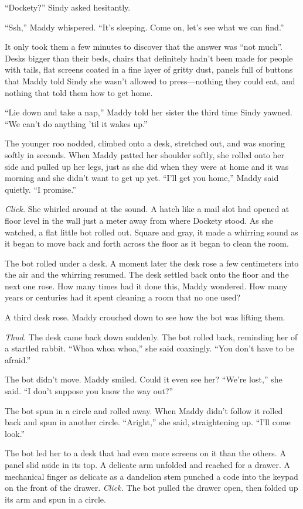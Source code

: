 \documentclass[10pt]{article}
\begin{document}
``Dockety?'' Sindy asked hesitantly.

``Ssh,'' Maddy whispered. ``It's sleeping. Come on, let's see what we
can find.''

It only took them a few minutes to discover that the answer was ``not
much''. Desks bigger than their beds, chairs that definitely hadn't been
made for people with tails, flat screens coated in a fine layer of
gritty dust, panels full of buttons that Maddy told Sindy she wasn't
allowed to press---nothing they could eat, and nothing that told them
how to get home.

``Lie down and take a nap,'' Maddy told her sister the third time Sindy
yawned. ``We can't do anything 'til it wakes up.''

The younger roo nodded, climbed onto a desk, stretched out, and was
snoring softly in seconds. When Maddy patted her shoulder softly, she
rolled onto her side and pulled up her legs, just as she did when they
were at home and it was morning and she didn't want to get up yet.
``I'll get you home,'' Maddy said quietly. ``I promise.''

\emph{Click.} She whirled around at the sound. A hatch like a mail slot
had opened at floor level in the wall just a meter away from where
Dockety stood. As she watched, a flat little bot rolled out. Square and
gray, it made a whirring sound as it began to move back and forth across
the floor as it began to clean the room.

The bot rolled under a desk. A moment later the desk rose a few
centimeters into the air and the whirring resumed. The desk settled back
onto the floor and the next one rose. How many times had it done this,
Maddy wondered. How many years or centuries had it spent cleaning a room
that no one used?

A third desk rose. Maddy crouched down to see how the bot was lifting
them.

\emph{Thud.} The desk came back down suddenly. The bot rolled back,
reminding her of a startled rabbit. ``Whoa whoa whoa,'' she said
coaxingly. ``You don't have to be afraid.''

The bot didn't move. Maddy smiled. Could it even see her? ``We're
lost,'' she said. ``I don't suppose you know the way out?''

The bot spun in a circle and rolled away. When Maddy didn't follow it
rolled back and spun in another circle. ``Aright,'' she said,
straightening up. ``I'll come look.''

The bot led her to a desk that had even more screens on it than the
others. A panel slid aside in its top. A delicate arm unfolded and
reached for a drawer. A mechanical finger as delicate as a dandelion
stem punched a code into the keypad on the front of the drawer.
\emph{Click.} The bot pulled the drawer open, then folded up its arm and
spun in a circle.
\end{document}
